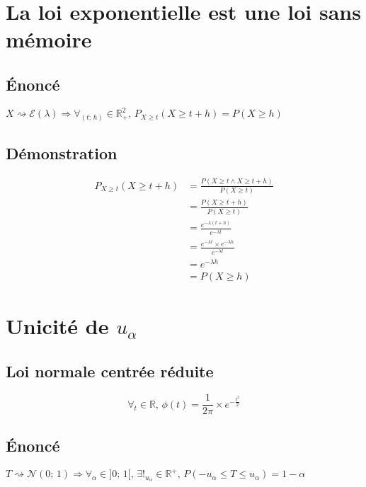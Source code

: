 \documentclass[12px]{article}
\begin{document}
	\section{La loi exponentielle est une loi sans mémoire}
	
	\subsection{\'Enoncé}
	$X\rightsquigarrow\mathcal{E}(\lambda) \Rightarrow \forall_{(t;\, h)}\in\mathbb{R}_+^2,
	\,P_{X\geq t}(X\geq t+h) = P(X\geq h)$
	
	\subsection{Démonstration}
	\begin{align*}
	P_{X\geq t}(X\geq t+h) &= \frac{P(X\geq t\wedge X\geq t+h)}{P(X\geq t)}\\
	&= \frac{P(X\geq t+h)}{P(X\geq t)}\\
	&= \frac{ e^{-\lambda (t+h)} }{ e^{-\lambda t} }\\
	&= \frac{ e^{-\lambda t}\times e^{-\lambda h} }{ e^{-\lambda t} }\\
	&= e^{-\lambda h}\\
	&= P(X\geq h)
	\end{align*}
	
	\section{Unicité de $u_\alpha$}
	
	\subsection{Loi normale centrée réduite}
	\begin{displaymath}
		\forall_t\in\mathbb{R},\, \phi (t) = \frac{1}{2\pi}\times e^{ -\frac{t^2}{2} }
	\end{displaymath}
	
	\subsection{\'Enoncé}
	$T\rightsquigarrow\mathcal{N}(0;\, 1)\Rightarrow
	\forall_\alpha\in ]0;\, 1[,\, \exists !_{u_\alpha}\in\mathbb{R}^+,\, P(-u_\alpha\leq T\leq
	u_\alpha) = 1 - \alpha$\\
	
\end{document}
